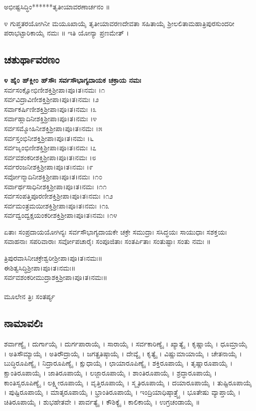  ಅಭೀಷ್ಟಸಿದ್ಧಿಂ******ತೃತೀಯಾವರಣಾರ್ಚನಂ ॥

೪ ಗುಪ್ತತರಯೋಗಿನೀ ಮಯೂಖಾಯೈ ತೃತೀಯಾವರಣದೇವತಾ ಸಹಿತಾಯೈ ಶ್ರೀಲಲಿತಾಮಹಾತ್ರಿಪುರಸುಂದರೀ ಪರಾಭಟ್ಟಾರಿಕಾಯೈ ನಮಃ ॥ ಇತಿ ಯೋನ್ಯಾ ಪ್ರಣಮೇತ್ ।
\subsection{ಚತುರ್ಥಾವರಣಂ}
{\bfseries ೪ ಹೈಂ ಹ್‌ಕ್ಲೀಂ ಹ್‌ಸೌಃ ಸರ್ವಸೌಭಾಗ್ಯದಾಯಕ ಚಕ್ರಾಯ ನಮಃ}\\
 ಸರ್ವಸಂಕ್ಷೋಭಿಣೀಶಕ್ತಿಶ್ರೀಪಾ।ಪೂ।ತ।ನಮಃ ।೧\\
 ಸರ್ವವಿದ್ರಾವಿಣೀಶಕ್ತಿಶ್ರೀಪಾ।ಪೂ।ತ।ನಮಃ ।೨\\
 ಸರ್ವಾಕರ್ಷಿಣೀಶಕ್ತಿಶ್ರೀಪಾ।ಪೂ।ತ।ನಮಃ ।೩\\
 ಸರ್ವಾಹ್ಲಾದಿನೀಶಕ್ತಿಶ್ರೀಪಾ।ಪೂ।ತ।ನಮಃ ।೪\\
 ಸರ್ವಸಮ್ಮೋಹಿನೀಶಕ್ತಿಶ್ರೀಪಾ।ಪೂ।ತ।ನಮಃ ।೫\\
 ಸರ್ವಸ್ತಂಭಿನೀಶಕ್ತಿಶ್ರೀಪಾ।ಪೂ।ತ।ನಮಃ ।೬\\
 ಸರ್ವಜೃಂಭಿಣೀಶಕ್ತಿಶ್ರೀಪಾ।ಪೂ।ತ।ನಮಃ ।೭\\
 ಸರ್ವವಶಂಕರೀಶಕ್ತಿಶ್ರೀಪಾ।ಪೂ।ತ।ನಮಃ ।೮\\
 ಸರ್ವರಂಜನೀಶಕ್ತಿಶ್ರೀಪಾ।ಪೂ।ತ।ನಮಃ ।೯\\
 ಸರ್ವೋನ್ಮಾದಿನೀಶಕ್ತಿಶ್ರೀಪಾ।ಪೂ।ತ।ನಮಃ ।೧೦\\
 ಸರ್ವಾರ್ಥಸಾಧಿನೀಶಕ್ತಿಶ್ರೀಪಾ।ಪೂ।ತ।ನಮಃ ।೧೧\\
 ಸರ್ವಸಂಪತ್ತಿಪೂರಣೀಶಕ್ತಿಶ್ರೀಪಾ।ಪೂ।ತ।ನಮಃ ।೧೨\\
 ಸರ್ವಮಂತ್ರಮಯೀಶಕ್ತಿಶ್ರೀಪಾ।ಪೂ।ತ।ನಮಃ ।೧೩\\
 ಸರ್ವದ್ವಂದ್ವಕ್ಷಯಂಕರೀಶಕ್ತಿಶ್ರೀಪಾ।ಪೂ।ತ।ನಮಃ ।೧೪

 ಏತಾಃ ಸಂಪ್ರದಾಯಯೋಗಿನ್ಯಃ ಸರ್ವಸೌಭಾಗ್ಯದಾಯಕೇ ಚಕ್ರೇ ಸಮುದ್ರಾಃ ಸಸಿದ್ಧಯಃ ಸಾಯುಧಾಃ ಸಶಕ್ತಯಃ ಸವಾಹನಾಃ ಸಪರಿವಾರಾಃ ಸರ್ವೋಪಚಾರೈಃ ಸಂಪೂಜಿತಾಃ ಸಂತರ್ಪಿತಾಃ ಸಂತುಷ್ಟಾಃ ಸಂತು ನಮಃ ॥

 ತ್ರಿಪುರವಾಸಿನೀಚಕ್ರೇಶ್ವರೀಶ್ರೀಪಾ।ಪೂ।ತ।ನಮಃ॥\\
 ಈಶಿತ್ವಸಿದ್ಧಿಶ್ರೀಪಾ।ಪೂ।ತ।ನಮಃ॥\\
 ಸರ್ವವಶಂಕರೀಮುದ್ರಾಶಕ್ತಿಶ್ರೀಪಾ।ಪೂ।ತ।ನಮಃ॥\\
\\
ಮೂಲೇನ ತ್ರಿಃ ಸಂತರ್ಪ್ಯ
\subsection{ನಾಮಾವಲಿಃ}
ಶರ್ವಾಣ್ಯೈ । ದುರ್ಗಾಯೈ । ದುರ್ಗಪಾರಾಯೈ । ಸಾರಾಯೈ । ಸರ್ವಕಾರಿಣ್ಯೈ । ಖ್ಯಾತ್ಯೈ । ಕೃಷ್ಣಾಯೈ । ಧೂಮ್ರಾಯೈ । ಅತಿಸೌಮ್ಯಾಯೈ । ಅತಿರೌದ್ರಾಯೈ । ಜಗತ್ಪ್ರತಿಷ್ಠಾಯೈ । ದೇವ್ಯೈ । ಕೃತ್ಯೈ । ವಿಷ್ಣುಮಾಯಾಯೈ । ಚೇತನಾಯೈ । ಬುದ್ಧಿರೂಪಿಣ್ಯೈ । ನಿದ್ರಾರೂಪಿಣ್ಯೈ । ಕ್ಷುಧಾಯೈ । ಛಾಯಾರೂಪಿಣ್ಯೈ । ಶಕ್ತಿರೂಪಾಯೈ । ತೃಷ್ಣಾರೂಪಾಯೈ । ಕ್ಷಾಂತಿರೂಪಾಯೈ । ಜಾತಿರೂಪಾಯೈ । ಲಜ್ಜಾರೂಪಾಯೈ । ಶಾಂತಿರೂಪಾಯೈ । ಶ್ರದ್ಧಾರೂಪಾಯೈ । ಕಾಂತಿಸ್ವರೂಪಿಣ್ಯೈ । ಲಕ್ಷ್ಮೀರೂಪಾಯೈ । ವೃತ್ತಿರೂಪಾಯೈ । ಸ್ಮೃತಿರೂಪಾಯೈ । ದಯಾರೂಪಾಯೈ । ತುಷ್ಟಿರೂಪಾಯೈ । ಪುಷ್ಟಿರೂಪಾಯೈ । ಮಾತೃರೂಪಾಯೈ । ಭ್ರಾಂತಿರೂಪಾಯೈ । ಇಂದ್ರಿಯಾಧಿಷ್ಠಾತ್ರ್ಯೈ । ಭೂತೇಷು ವ್ಯಾಪ್ತಾಯೈ । ಚಿತಿರೂಪಾಯೈ । ಶುಭಹೇತವೇ । ಪಾರ್ವತ್ಯೈ । ಕೌಶಿಕ್ಯೈ । ಕಾಲಿಕಾಯೈ । ಉಗ್ರಚಂಡಾಯೈ ॥ \\


